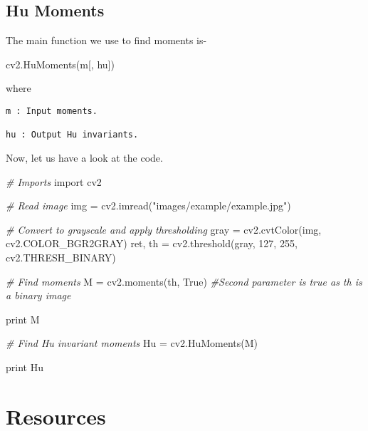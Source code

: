 \documentclass[]{article}
\newenvironment{Shaded}{}{}
\newcommand{\DecValTok}[1]{\textcolor[rgb]{0.25,0.63,0.44}{{#1}}}
\newcommand{\StringTok}[1]{\textcolor[rgb]{0.25,0.44,0.63}{{#1}}}
\newcommand{\ImportTok}[1]{{#1}}
\newcommand{\CommentTok}[1]{\textcolor[rgb]{0.38,0.63,0.69}{\textit{{#1}}}}
\newcommand{\VariableTok}[1]{\textcolor[rgb]{0.10,0.09,0.49}{{#1}}}
\newcommand{\OperatorTok}[1]{\textcolor[rgb]{0.40,0.40,0.40}{{#1}}}
\newcommand{\BuiltInTok}[1]{{#1}}
\newcommand{\NormalTok}[1]{{#1}}
\begin{document}
\subsection{Hu Moments}\label{hu-moments}

The main function we use to find moments is-

\begin{Shaded}
\begin{Highlighting}[]
    \NormalTok{cv2.HuMoments(m[, hu])}
\end{Highlighting}
\end{Shaded}

where

\begin{verbatim}
m : Input moments.

hu : Output Hu invariants.
\end{verbatim}

Now, let us have a look at the code.

\begin{Shaded}
\begin{Highlighting}[]
\CommentTok{# Imports}
\ImportTok{import} \NormalTok{cv2}

\CommentTok{# Read image}
\NormalTok{img }\OperatorTok{=} \NormalTok{cv2.imread(}\StringTok{"images/example/example.jpg"}\NormalTok{)}

\CommentTok{# Convert to grayscale and apply thresholding}
\NormalTok{gray }\OperatorTok{=} \NormalTok{cv2.cvtColor(img, cv2.COLOR_BGR2GRAY)}
\NormalTok{ret, th }\OperatorTok{=} \NormalTok{cv2.threshold(gray, }\DecValTok{127}\NormalTok{, }\DecValTok{255}\NormalTok{, cv2.THRESH_BINARY)}

\CommentTok{# Find moments}
\NormalTok{M }\OperatorTok{=} \NormalTok{cv2.moments(th, }\VariableTok{True}\NormalTok{) }\CommentTok{#Second parameter is true as th is a binary image}

\BuiltInTok{print} \NormalTok{M}

\CommentTok{# Find Hu invariant moments}
\NormalTok{Hu }\OperatorTok{=} \NormalTok{cv2.HuMoments(M)}

\BuiltInTok{print} \NormalTok{Hu}
\end{Highlighting}
\end{Shaded}

\section{Resources}\label{resources}
\end{document}
